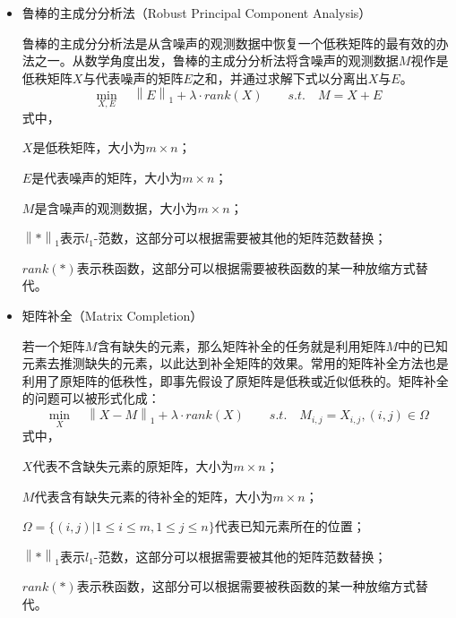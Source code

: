 \documentclass[12pt, a4paper]{article}
\begin{document}
\begin{itemize}
\item 鲁棒的主成分分析法（Robust Principal Component Analysis）
\par 鲁棒的主成分分析法是从含噪声的观测数据中恢复一个低秩矩阵的最有效的办法之一。从数学角度出发，鲁棒的主成分分析法将含噪声的观测数据$M$视作是低秩矩阵$X$与代表噪声的矩阵$E$之和，并通过求解下式以分离出$X$与$E$。
\begin{displaymath}
\min\limits_{X,E}\quad \left\|E\right\|_1 + \lambda \cdot rank(X) \qquad s.t.\quad M=X+E
\end{displaymath}
式中，
\par$X$是低秩矩阵，大小为$m \times n$；
\par$E$是代表噪声的矩阵，大小为$m \times n$；
\par$M$是含噪声的观测数据，大小为$m \times n$；
\par$\left\|*\right\|_1$表示$l_1$-范数，这部分可以根据需要被其他的矩阵范数替换；
\par$rank(*)$表示秩函数，这部分可以根据需要被秩函数的某一种放缩方式替代。
\item 矩阵补全（Matrix Completion）
\par 若一个矩阵$M$含有缺失的元素，那么矩阵补全的任务就是利用矩阵$M$中的已知元素去推测缺失的元素，以此达到补全矩阵的效果。常用的矩阵补全方法也是利用了原矩阵的低秩性，即事先假设了原矩阵是低秩或近似低秩的。矩阵补全的问题可以被形式化成：
\begin{displaymath}
\min\limits_{X}\quad \left\|X-M\right\|_1 + \lambda \cdot rank(X) \qquad s.t.\quad M_{i,j}=X_{i,j}, (i,j)\in\Omega
\end{displaymath}
式中，
\par$X$代表不含缺失元素的原矩阵，大小为$m \times n$；
\par$M$代表含有缺失元素的待补全的矩阵，大小为$m \times n$；
\par$\Omega=\{(i,j)|1\leq i \leq m, 1\leq j \leq n\}$代表已知元素所在的位置；
\par$\left\|*\right\|_1$表示$l_1$-范数，这部分可以根据需要被其他的矩阵范数替换；
\par$rank(*)$表示秩函数，这部分可以根据需要被秩函数的某一种放缩方式替代。
		
		

\end{itemize}
\end{document}
